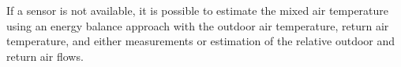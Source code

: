 If a sensor is not available, it is possible to estimate the mixed air 
temperature using an energy balance approach with the outdoor air temperature,
return air temperature, and either measurements or estimation of the relative
outdoor and return air flows. 








